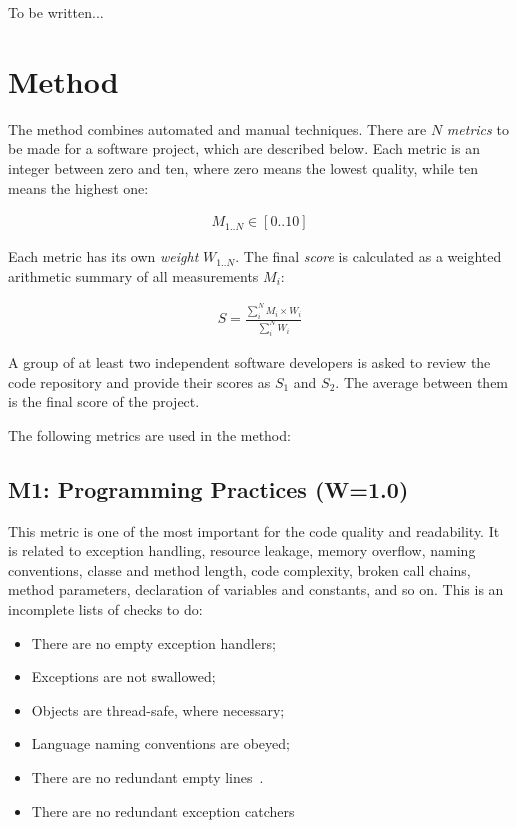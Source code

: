 \documentclass[manuscript,12pt,nonacm=true,oneside]{acmart}
\begin{document}
To be written...

\section{Method}
\label{sec:method}

The method combines automated and manual techniques. There are $N$
\emph{metrics} to be made for a software project, which are described
below. Each metric is an integer between zero and ten, where
zero means the lowest quality, while ten means the highest one:

\begin{eqnarray}
M_{1..N} \in [ 0 .. 10 ]
\end{eqnarray}

Each metric has its own \emph{weight} $W_{1..N}$.
The final \emph{score} is calculated
as a weighted arithmetic summary of all measurements $M_i$:

\begin{align}
S = \frac{\sum_i^N M_i \times W_i}{\sum_i^N W_i}
\end{align}

A group of at least two independent software developers is asked to review the code
repository and provide their scores as $S_1$ and $S_2$. The average between
them is the final score of the project.

The following metrics are used in the method:

\subsection{M1: Programming Practices (W=1.0)}

This metric is one of the most important for the code quality and readability.
It is related to exception handling, resource leakage, memory overflow,
naming conventions, classe and method length, code complexity,
broken call chains, method parameters, declaration of variables and constants,
and so on. This is an incomplete lists of checks to do:

\begin{itemize}
\item There are no empty exception handlers;
\item Exceptions are not swallowed;
\item Objects are thread-safe, where necessary;
\item Language naming conventions are obeyed;
\item There are no redundant empty lines~\citet{yb-empty-lines}.
\item There are no redundant exception catchers~\citep{yb-dont-catch}
\end{itemize}
\end{document}
